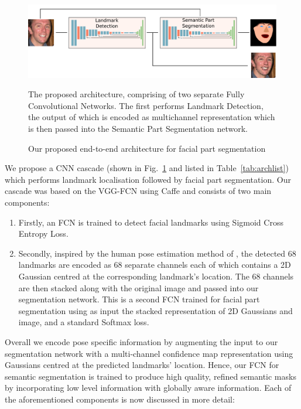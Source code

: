 \begin{figure}
\includegraphics[width=\linewidth]{figs/Proposed.pdf}
\caption{Our proposed end-to-end architecture for facial part
  segmentation}{The proposed architecture, comprising of two separate
  Fully Convolutional Networks. The first performs Landmark Detection,
  the output of which is encoded as multichannel representation which
  is then passed into the Semantic Part Segmentation network.}
\label{fig:proposed}
\end{figure}

We propose a CNN cascade (shown in Fig.~\ref{fig:proposed} and listed
in Table~\ref{tab:archlist}) which performs landmark localisation
followed by facial part segmentation. Our cascade was based on the
VGG-FCN \cite{simonyan2014very,long2015fully} using Caffe
\cite{jia2014caffe} and consists of two main components:
\begin{enumerate}
\item Firstly, an FCN is trained to detect facial landmarks using
  Sigmoid Cross Entropy Loss.
\item Secondly, inspired by the human pose estimation method of
  \cite{carreira2016human}, the detected 68 landmarks are encoded as
  68 separate channels each of which contains a 2D Gaussian centred
  at the corresponding landmark's location. The 68 channels are then
  stacked along with the original image and passed into our
  segmentation network. This is a second FCN trained for facial part
  segmentation using as input the stacked representation of 2D
  Gaussians and image, and a standard Softmax loss.
\end{enumerate}

Overall we encode pose specific information by augmenting the input to
our segmentation network with a multi-channel confidence map
representation using Gaussians centred at the predicted landmarks'
location. Hence, our FCN for semantic segmentation is trained to
produce high quality, refined semantic masks by incorporating low
level information with globally aware information. Each of the
aforementioned components is now discussed in more detail:

